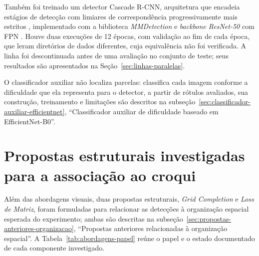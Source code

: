 Tamb\'em foi treinado um detector Cascade R-CNN, arquitetura que encadeia est\'agios de detec\c{c}\~ao com limiares de correspond\^encia progressivamente mais estritos \citep{cai2018}, implementado com a biblioteca \textit{MMDetection} e \textit{backbone ResNet-50} \citep{he2016} com FPN \citep{lin2017}. Houve duas execu\c{c}\~oes de 12 \'epocas, com valida\c{c}\~ao ao fim de cada \'epoca, que leram diret\'orios de dados diferentes, cuja equival\^encia n\~ao foi verificada. A linha foi descontinuada antes de uma avalia\c{c}\~ao no conjunto de teste; seus resultados s\~ao apresentados na Se\c{c}\~ao~\ref{sec:linhas-paralelas}.

O classificador auxiliar n\~ao localiza parcelas: classifica cada imagem conforme a dificuldade que ela representa para o detector, a partir de r\'otulos avaliados, sua constru\c{c}\~ao, treinamento e limita\c{c}\~oes s\~ao descritos na subse\c{c}\~ao~\ref{sec:classificador-auxiliar-efficientnet}, ``Classificador auxiliar de dificuldade baseado em EfficientNet-B0''.

\section{Propostas estruturais investigadas para a associa\c{c}\~ao ao croqui}
\label{sec:propostas-estruturais}

Al\'em das abordagens visuais, duas propostas estruturais, \textit{Grid Completion} e \textit{Loss de Matriz}, foram formuladas para relacionar as detec\c{c}\~oes \`a organiza\c{c}\~ao espacial esperada do experimento; ambas s\~ao descritas na subse\c{c}\~ao~\ref{sec:propostas-anteriores-organizacao}, ``Propostas anteriores relacionadas \`a organiza\c{c}\~ao espacial''. A Tabela~\ref{tab:abordagens-papel} re\'une o papel e o estado documentado de cada componente investigado.

